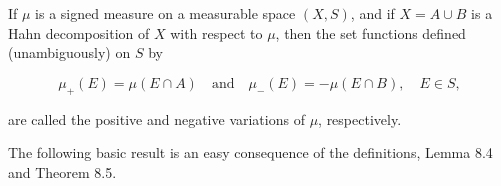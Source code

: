 If $\mu$ is a signed measure on a measurable space $(X, S)$, and if $X = A \cup B$ is a Hahn decomposition of $X$ with respect to $\mu$, then the set functions defined (unambiguously) on $S$ by

$$\mu_+(E) = \mu(E \cap A) \quad \text{and} \quad \mu_-(E) = -\mu(E \cap B), \quad E \in S,$$

are called the positive and negative variations of $\mu$, respectively.

The following basic result is an easy consequence of the definitions, Lemma 8.4 and Theorem 8.5.

